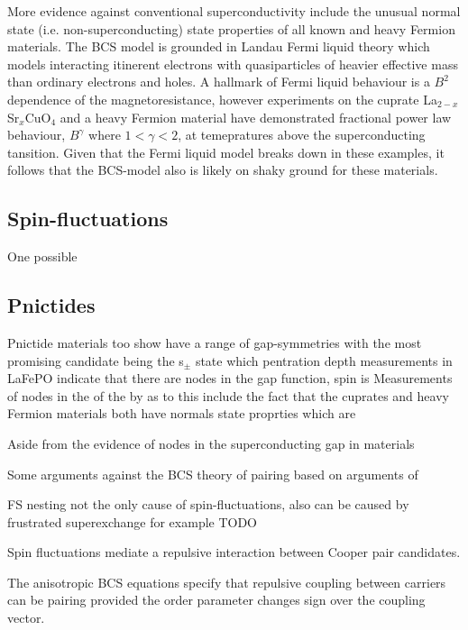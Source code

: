 More evidence against conventional superconductivity include the unusual normal state (i.e. non-superconducting) state properties of all known \highTc and heavy Fermion materials. The BCS model is grounded in Landau Fermi liquid theory which models interacting itinerent electrons with quasiparticles of heavier effective mass than ordinary electrons and holes. A hallmark of Fermi liquid behaviour is a $B^2$ dependence of the magnetoresistance, however experiments on the cuprate La$_{2-x}$Sr$_{x}$CuO$_4$\cite{Cooper2009} and a heavy Fermion material\cite{Custers2003} have demonstrated fractional power law behaviour, $B^\gamma$ where $1 < \gamma < 2$, at temepratures above the superconducting tansition. Given that the Fermi liquid model breaks down in these examples, it follows that the BCS-model also is likely on shaky ground for these materials.

\subsection{Spin-fluctuations}

One possible 

\subsection{Pnictides}

Pnictide materials too show have a range of gap-symmetries with the most promising candidate being the s$_\pm$ state which   pentration depth measurements in LaFePO indicate that there are nodes in the gap function\cite{Fletcher2009},  spin is Measurements of nodes in the  of the  by  as to this include the fact that the cuprates and heavy Fermion materials both have normals state proprties which are 

Aside from the evidence of nodes in the superconducting gap in materials 

Some arguments against the BCS theory of pairing \cite{Haule2008,Yndurain2009,Mazin2008} based on arguments of 


FS nesting not the only cause of spin-fluctuations, also can be caused by frustrated superexchange for example TODO

Spin fluctuations mediate a repulsive interaction between Cooper pair candidates.

The anisotropic BCS equations specify that repulsive coupling between carriers can be pairing provided the order parameter changes sign over the coupling vector.


